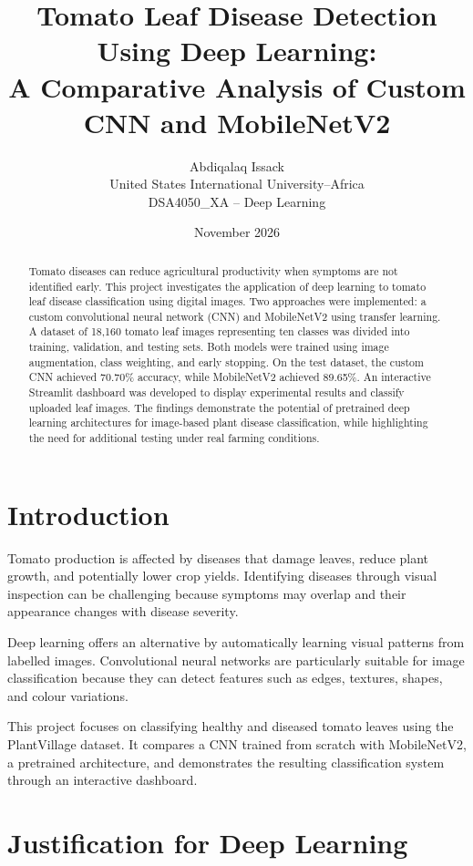 \documentclass[12pt,a4paper]{article}
\title{\textbf{Tomato Leaf Disease Detection Using Deep Learning:}\\
A Comparative Analysis of Custom CNN and MobileNetV2}
\author{
Abdiqalaq Issack\\
United States International University--Africa\\
DSA4050\_XA -- Deep Learning
}
\date{November 2026}
\begin{document}
\maketitle

\begin{abstract}
Tomato diseases can reduce agricultural productivity when symptoms are not identified early. This project investigates the application of deep learning to tomato leaf disease classification using digital images. Two approaches were implemented: a custom convolutional neural network (CNN) and MobileNetV2 using transfer learning. A dataset of 18,160 tomato leaf images representing ten classes was divided into training, validation, and testing sets. Both models were trained using image augmentation, class weighting, and early stopping. On the test dataset, the custom CNN achieved 70.70\% accuracy, while MobileNetV2 achieved 89.65\%. An interactive Streamlit dashboard was developed to display experimental results and classify uploaded leaf images. The findings demonstrate the potential of pretrained deep learning architectures for image-based plant disease classification, while highlighting the need for additional testing under real farming conditions.
\end{abstract}

\section{Introduction}

Tomato production is affected by diseases that damage leaves, reduce plant growth, and potentially lower crop yields. Identifying diseases through visual inspection can be challenging because symptoms may overlap and their appearance changes with disease severity.

Deep learning offers an alternative by automatically learning visual patterns from labelled images. Convolutional neural networks are particularly suitable for image classification because they can detect features such as edges, textures, shapes, and colour variations.

This project focuses on classifying healthy and diseased tomato leaves using the PlantVillage dataset. It compares a CNN trained from scratch with MobileNetV2, a pretrained architecture, and demonstrates the resulting classification system through an interactive dashboard.

\section{Justification for Deep Learning}
\end{document}
